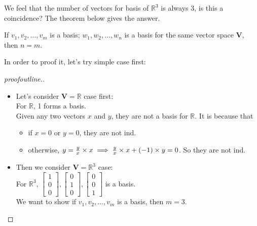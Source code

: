 We feel that the number of vectors for basis of $\mathbb{R}^{3}$ is always 3, is this a coincidence? The theorem below gives the answer.
\begin{theorem}\label{theorem_3.2}
If $v_1,v_2,\dots,v_m$ is a basis; $w_1,w_2,\dots,w_n$ is a basis for the same vector space $\bm V$, then $n=m$.
\end{theorem}
In order to proof it, let's try simple case first:
\begin{proof}[proofoutline.]\qquad\\

\begin{itemize}
\item
Let's consider $\bm V = \mathbb{R}$ case first:\\
For $\mathbb{R}$, 1 forms a basis.\\
Given any two vectors $x$ and $y$, they are not a basis for $\mathbb{R}$. It is because that
\begin{itemize}
\item
if $x=0$ or $y=0$, they are not ind.
\item
otherwise, $y = \frac{y}{x}\times x\implies \frac{y}{x}\times x + (-1)\times y = 0$. So they are not ind.
\end{itemize}\item
Then we consider $\bm V = \mathbb{R}^3$ case:\\
For $\mathbb{R}^3$, $\begin{bmatrix}
1\\0\\0
\end{bmatrix},\begin{bmatrix}
0\\1\\0
\end{bmatrix},\begin{bmatrix}
0\\0\\1
\end{bmatrix}$ is a basis.\\
We want to show if $v_1,v_2,\dots,v_m$ is a basis, then $m=3$.




\end{itemize}
\end{proof}
